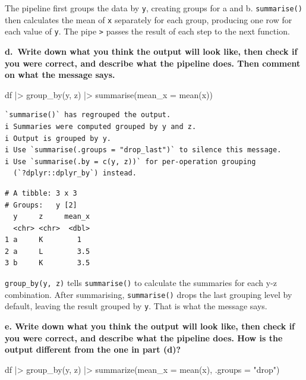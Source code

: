 \documentclass[
  letterpaper,
  DIV=11,
  numbers=noendperiod]{scrreprt}
\newenvironment{Shaded}{\begin{snugshade}}{\end{snugshade}}
\newcommand{\AttributeTok}[1]{\textcolor[rgb]{0.40,0.45,0.13}{#1}}
\newcommand{\FunctionTok}[1]{\textcolor[rgb]{0.28,0.35,0.67}{#1}}
\newcommand{\NormalTok}[1]{\textcolor[rgb]{0.00,0.23,0.31}{#1}}
\newcommand{\SpecialCharTok}[1]{\textcolor[rgb]{0.37,0.37,0.37}{#1}}
\newcommand{\StringTok}[1]{\textcolor[rgb]{0.13,0.47,0.30}{#1}}
\begin{document}
The pipeline first groups the data by \texttt{y}, creating groups for a
and b. \texttt{summarise()} then calculates the mean of \texttt{x}
separately for each group, producing one row for each value of
\texttt{y}. The pipe \texttt{\textbar{}\textgreater{}} passes the result
of each step to the next function.

\textbf{d.~Write down what you think the output will look like, then
check if you were correct, and describe what the pipeline does. Then
comment on what the message says.}

\begin{Shaded}
\begin{Highlighting}[]
\NormalTok{df }\SpecialCharTok{|\textgreater{}}
  \FunctionTok{group\_by}\NormalTok{(y, z) }\SpecialCharTok{|\textgreater{}}
  \FunctionTok{summarise}\NormalTok{(}\AttributeTok{mean\_x =} \FunctionTok{mean}\NormalTok{(x))}
\end{Highlighting}
\end{Shaded}

\begin{verbatim}
`summarise()` has regrouped the output.
i Summaries were computed grouped by y and z.
i Output is grouped by y.
i Use `summarise(.groups = "drop_last")` to silence this message.
i Use `summarise(.by = c(y, z))` for per-operation grouping
  (`?dplyr::dplyr_by`) instead.
\end{verbatim}

\begin{verbatim}
# A tibble: 3 x 3
# Groups:   y [2]
  y     z     mean_x
  <chr> <chr>  <dbl>
1 a     K        1  
2 a     L        3.5
3 b     K        3.5
\end{verbatim}

\texttt{group\_by(y,\ z)} tells \texttt{summarise()} to calculate the
summaries for each y-z combination. After summarising,
\texttt{summarise()} drops the last grouping level by default, leaving
the result grouped by \texttt{y}. That is what the message says.

\textbf{e. Write down what you think the output will look like, then
check if you were correct, and describe what the pipeline does. How is
the output different from the one in part (d)?}

\begin{Shaded}
\begin{Highlighting}[]
\NormalTok{df }\SpecialCharTok{|\textgreater{}}
  \FunctionTok{group\_by}\NormalTok{(y, z) }\SpecialCharTok{|\textgreater{}}
  \FunctionTok{summarize}\NormalTok{(}\AttributeTok{mean\_x =} \FunctionTok{mean}\NormalTok{(x), }\AttributeTok{.groups =} \StringTok{"drop"}\NormalTok{)}
\end{Highlighting}
\end{Shaded}
\end{document}
